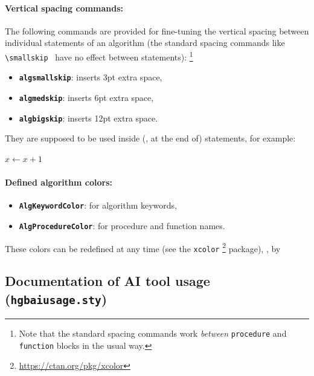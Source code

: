 \documentclass[language=english]{hgbarticle}
\begin{document}
\paragraph{Vertical spacing commands:}
The following commands are provided for fine-tuning the vertical spacing
between individual statements of an algorithm (the standard spacing commands
like \verb!\smallskip! \etc\ have no effect between statements):%
\footnote{Note that the standard spacing commands work \emph{between}
\texttt{procedure} and \texttt{function} blocks in the usual way.}
\begin{itemize}
    \item \textbf{{\bs}\texttt{algsmallskip}}: inserts 3pt extra space,
    \item \textbf{{\bs}\texttt{algmedskip}}: inserts 6pt extra space,
    \item \textbf{{\bs}\texttt{algbigskip}}: inserts 12pt extra space.
\end{itemize}
They are supposed to be used inside (\ie, at the end of) statements, for
example:
%
\begin{LaTeXCode}[numbers=none]
    \State $x \gets x + 1$ \algsmallskip
\end{LaTeXCode}

\paragraph{Defined algorithm colors:}
\begin{itemize}
    \item \textbf{\texttt{AlgKeywordColor}}: for algorithm keywords,
    \item \textbf{\texttt{AlgProcedureColor}}: for procedure and function names.
\end{itemize}
These colors can be redefined at any time (see the \texttt{xcolor}%
\footnote{\url{https://ctan.org/pkg/xcolor}}
package), \eg, by
\begin{LaTeXCode}[numbers=none]
\end{LaTeXCode}


\subsection{Documentation of AI tool usage (\texttt{hgbaiusage.sty})}
\label{sec:AIUsage}
\end{document}
